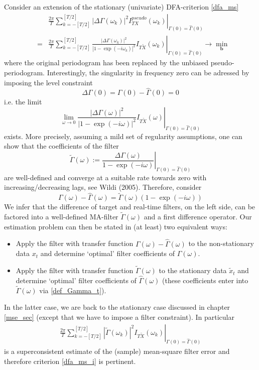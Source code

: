 \documentclass[a4paper]{book}
\begin{document}
Consider an extension of the stationary (univariate) DFA-criterion \ref{dfa_ms}
\begin{eqnarray}
&&\left.\frac{2\pi}{T}\sum_{k=-[T/2]}^{[T/2]}\left|\Delta\Gamma(\omega_k) \right|^2I_{TX}^{pseudo}(\omega_k)\right|_{\Gamma(0)=\hat{\Gamma}(0)}\nonumber\\
&=&\left.\frac{2\pi}{T}\sum_{k=-[T/2]}^{[T/2]}\frac{\left|\Delta\Gamma(\omega_k) \right|^2}{|1-\exp(-i\omega_k)|^2}I_{T\tilde{X}}(\omega_k)\right|_{\Gamma(0)=\hat{\Gamma}(0)}\to\min_{\mathbf{b}} \label{dfa_ms_i}
\end{eqnarray}
where the original periodogram has been replaced by the unbiased pseudo-periodogram. Interestingly, the singularity in frequency zero can be adressed by imposing the level constraint
\[\Delta\Gamma(0)=\Gamma(0)-\hat{\Gamma}(0)=0\]
i.e. the limit 
\[
\left.\lim_{\omega\to 0}\frac{\left|\Delta\Gamma(\omega) \right|^2}{|1-\exp(-i\omega)|^2}I_{T\tilde{X}}(\omega)\right|_{\Gamma(0)=\hat{\Gamma}(0)}
\]
exists. More precisely, assuming a mild set of regularity assumptions, one can show that the coefficients of the filter 
\begin{equation}\label{def_Gamma_t}
\tilde{\Gamma}(\omega):=\left.\displaystyle{\frac{\Delta\Gamma(\omega) }{1-\exp(-i\omega)}}\right|_{\Gamma(0)=\hat{\Gamma}(0)}
\end{equation} 
are well-defined and converge at a suitable rate towards zero with increasing/decreasing lags, see Wildi (2005). Therefore, consider 
\[\Gamma(\omega)-\hat{\Gamma}(\omega)=\tilde{\Gamma}(\omega)(1-\exp(-i\omega))\]
We infer that the difference of target and real-time filters, on the left side, can be factored into a well-defined MA-filter $\tilde{\Gamma}(\omega)$ and a first difference operator. Our estimation problem can then be stated in (at least) two equivalent ways:
\begin{itemize}
\item Apply the filter with transfer function $\Gamma(\omega)-\hat{\Gamma}(\omega)$ to the non-stationary data $x_t$ and determine `optimal' filter coefficients of $\hat{\Gamma}(\omega)$.
\item Apply the filter with transfer function $\tilde{\Gamma}(\omega)$ to the stationary data $\tilde{x}_t$ and determine `optimal' filter coefficients of $\hat{\Gamma}(\omega)$ (these coefficients enter into $\tilde{\Gamma}(\omega)$ via \ref{def_Gamma_t}).  
\end{itemize}
In the latter case, we are back to the stationary case discussed in chapter \ref{mse_sec} (except that we have to impose a filter constraint). In particular
\begin{eqnarray*}
\left.\frac{2\pi}{T}\sum_{k=-[T/2]}^{[T/2]}\left|\tilde{\Gamma}(\omega_k) \right|^2I_{T\tilde{X}}(\omega_k)\right|_{\Gamma(0)=\hat{\Gamma}(0)} 
\end{eqnarray*}
is a superconsistent estimate of the (sample) mean-square filter error and therefore criterion \ref{dfa_ms_i} is pertinent. \\
\end{document}
